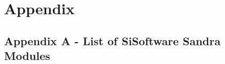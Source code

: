 

\chapter*{Appendix} \label{appendix}

\section*{Appendix A - List of SiSoftware Sandra Modules} \label{appA:sandra_modules}


